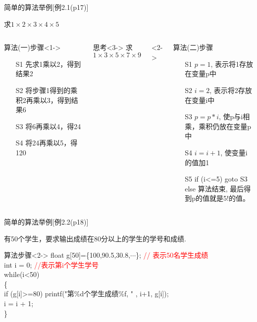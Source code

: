 \begin{frame}[shrink]{简单的算法举例[例2.1(p17)]}
\begin{example}
	[例2.1(p17)] 求$1\times 2\times 3\times 4\times 5$
\end{example}
\vspace{-0.7cm}
\small
\begin{columns}[t]
	\begin{block}{算法(一)步骤}<1->
		\begin{enumerate}
			\item[S1] 先求1乘以2，得到结果2
			\item[S2] 将步骤1得到的乘积2再乘以3，得到结果6
			\item[S3] 将6再乘以4，得24
			\item[S4] 将24再乘以5，得120
		\end{enumerate}	
	\end{block}
    \begin{block}{思考}<3->
    	求$1\times 3\times 5\times 7\times 9$
    \end{block}
	<2->
	\begin{block}{算法(二)步骤}
		\begin{enumerate}
			\item[S1] $p=1$, 表示将1存放在变量p中
			\item[S2] $i=2$, 表示将2存放在变量i中
			\item[S3] $p=p*i$, 使p与i相乘，乘积仍放在变量p中
			\item[S4] $i=i+1$, 使变量i的值加1
			\item[S5] if (i<=5) goto S3\\
			          else 算法结束, 最后得到p的值就是5!的值。
		\end{enumerate}	
	\end{block}
\end{columns}
\end{frame}

\begin{frame}[shrink]{简单的算法举例[例2.2(p18)]}
\begin{example}
	[例2.2(p18)] 有50个学生，要求输出成绩在80分以上的学生的学号和成绩.
\end{example}

\begin{block}{算法步骤}<2->
	float g[50]=\{100,90.5,30.8,$\cdots$\}; \textcolor{red}{// 表示50名学生成绩}\\
	int i = 0;  \textcolor{red}{//表示第i个学生学号}\\
	while(i<50) \\
	\{ \\
	   \qquad if (g[i]>=80) printf("第\%d个学生成绩\%f, " , i+1, g[i]); \\
	   \qquad i = i + 1;\\
	\} 
\end{block}
\end{frame}

